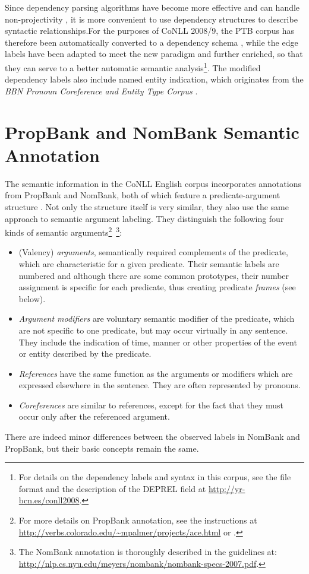 \documentclass[12pt,notitlepage]{report}
\begin{document}
Since dependency parsing algorithms have become more effective and can handle non-projectivity \citep[cf.][]{mcdonald05}, it is more convenient to use dependency structures to describe syntactic relationships.For the purposes of CoNLL 2008/9, the PTB corpus has therefore been automatically converted to a dependency schema \citep{johansson07,surdeanu08}, while the edge labels have been adapted to meet the new paradigm and further enriched, so that they can serve to a better automatic semantic analysis\footnote{For details on the dependency labels and syntax in this corpus, see the file format and the description of the DEPREL field at \url{http://yr-bcn.es/conll2008}.}. The modified dependency labels also include named entity indication, which originates from the \emph{BBN Pronoun Coreference and Entity Type Corpus} \citep{weischedel05}.

\section{PropBank and NomBank Semantic Annotation}\label{propbank-nombank}

The semantic information in the CoNLL English corpus incorporates annotations from PropBank and NomBank, both of which feature a predicate-argument structure \citep[cf. Section \ref{problem} and][]{kingsbury02}. Not only the structure itself is very similar, they also use the same approach to semantic argument labeling. They distinguish the following four kinds of semantic arguments\footnote{For more details on PropBank annotation, see the instructions at \url{http://verbs.colorado.edu/~mpalmer/projects/ace.html} or \citep{moreda06}.}~\footnote{The NomBank annotation is thoroughly described in the guidelines at: \\ \url{http://nlp.cs.nyu.edu/meyers/nombank/nombank-specs-2007.pdf}.}:
\begin{itemize} 
    \item (Valency) \emph{arguments}, semantically required complements of the predicate, which are characteristic for a given predicate. Their semantic labels are numbered and although there are some common prototypes, their number assignment is specific for each predicate, thus creating predicate \emph{frames} (see below).
    \item \emph{Argument modifiers} are voluntary semantic modifier of the predicate, which are not specific to one predicate, but may occur virtually in any sentence. They include the indication of time, manner or other properties of the event or entity described by the predicate.
    \item \emph{References} have the same function as the arguments or modifiers which are expressed elsewhere in the sentence. They are often represented by pronouns.
    \item \emph{Coreferences} are similar to references, except for the fact that they must occur only after the referenced argument. %
\end{itemize}
There are indeed minor differences between the observed labels in NomBank and PropBank, but their basic concepts remain the same.
\end{document}
